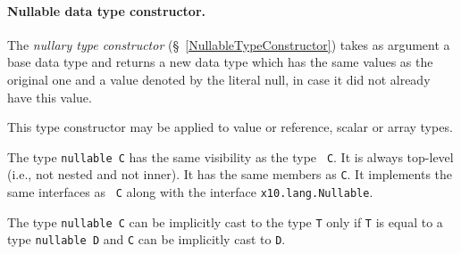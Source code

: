 \paragraph{Nullable data type constructor.}
The {\em nullary type constructor} (\S~\ref{NullableTypeConstructor})
takes as argument a base data type and returns a new data type which
has the same values as the original one and a value denoted by the
literal {\cf null}, in case it did not already have this value.

\begin{x10}
{\em NullaryDataType ::}
   nullable \em{}BaseDataType}
\end{x10}

This type constructor may be applied to value or reference, scalar or
array types.

The type {\tt nullable C} has the same visibility as the type {\tt
C}. It is always top-level (i.e., not nested and not inner). It has
the same members as {\tt C}. It implements the same interfaces as {\tt
C} along with the interface {\tt x10.lang.Nullable}.

The type {\tt nullable C} can be implicitly cast to the type {\tt T}
only if {\tt T} is equal to a type {\tt nullable D} and {\tt C} can be
implicitly cast to {\tt D}.
